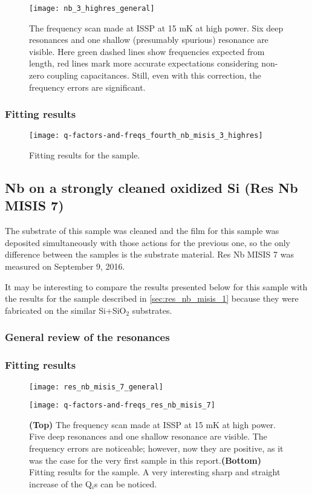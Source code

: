 \documentclass[12pt]{article}
\numberwithin{equation}{section}
\numberwithin{figure}{section}
\begin{document}
\begin{figure}[h]
\centering
\texttt{[image: nb\_3\_highres\_general]}
\caption{The frequency scan made at ISSP at 15 mK at high power. Six deep resonances and one shallow (presumably spurious) resonance are visible. Here green dashed lines show frequencies expected from length, red lines mark more accurate expectations considering non-zero coupling capacitances. Still, even with this correction, the frequency errors are significant.}
\end{figure}

\subsubsection{Fitting results}

\begin{figure}[h]
\centering
\texttt{[image: q-factors-and-freqs\_fourth\_nb\_misis\_3\_highres]}
\caption{Fitting results for the sample.}
\end{figure}

\subsection{Nb on a strongly cleaned oxidized Si (Res Nb MISIS 7)}

The substrate of this sample was cleaned and the film for this sample was deposited simultaneously with those actions for the previous one, so the only difference between the samples is the substrate material. Res Nb MISIS 7 was measured on September 9, 2016.

It may be interesting to compare the results presented below for this sample with the results for the sample described in \autoref{sec:res_nb_misis_1} because they were fabricated on the similar Si+SiO$_2$ substrates.

\subsubsection{General review of the resonances}
\subsubsection{Fitting results}

\begin{figure}[h!]
\centering
\texttt{[image: res\_nb\_misis\_7\_general]}

\vspace{.5cm}
\texttt{[image: q-factors-and-freqs\_res\_nb\_misis\_7]}
\caption{\textbf{(Top)} The frequency scan made at ISSP at 15 mK at high power. Five deep resonances and one shallow  resonance are visible. The frequency errors are noticeable; however, now they are positive, as it was the case for the very first sample in this report.\textbf{(Bottom)} Fitting results for the sample. A very interesting sharp and straight increase of the Q$_i$s can be noticed.}
\end{figure}
\end{document}
